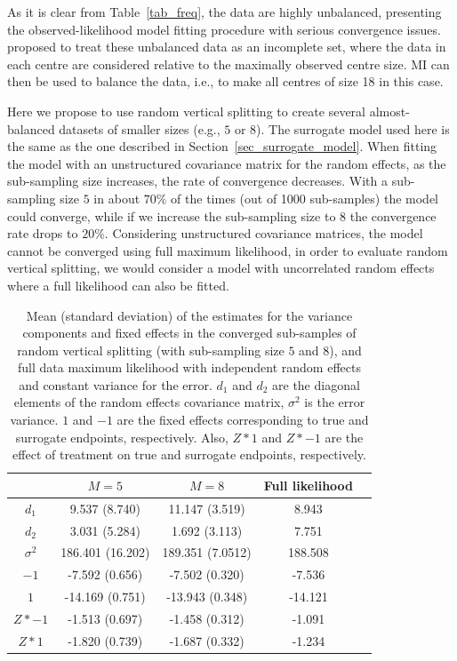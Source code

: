 \documentclass[11pt,a5paper,twoside]{book}
\begin{document}
As it is clear from Table~\ref{tab_freq}, the data are highly unbalanced, presenting the observed-likelihood model fitting procedure with serious convergence issues. \cite{wim2015} proposed to treat these unbalanced data as an incomplete set, where the data in each centre are considered relative to the maximally observed centre size. MI can then be used to balance the data, i.e., to make all centres of size 18 in this case. 

Here we propose to use random vertical splitting to create several almost- balanced datasets of smaller sizes (e.g., $5$ or $8$). The surrogate model used here is the same as the one described in Section~\ref{sec_surrogate_model}. When fitting the model with an unstructured covariance matrix for the random effects, as the sub-sampling size increases, the rate of convergence decreases. With a sub-sampling size $5$ in about $70\%$ of the times (out of 1000 sub-samples) the model could converge, while if we increase the sub-sampling size to $8$ the convergence rate drops to $20\%$. Considering unstructured covariance matrices, the model cannot be converged using full maximum likelihood, in order to evaluate random vertical splitting, we would consider a model with uncorrelated random effects where a full likelihood can also be fitted.


\begin{table}[h]
\centering
\caption[Analyzing ARMD data with random vertical splitting]{Mean (standard deviation) of the estimates for the variance components and fixed effects in the converged sub-samples of random vertical splitting (with sub-sampling size $5$ and $8$), and full data maximum likelihood with independent random effects and constant variance for the error. $d_1$ and $d_2$ are the diagonal elements of the random effects covariance matrix, $\sigma^2$ is the error variance. $1$ and $-1$ are the fixed effects corresponding to true and surrogate endpoints, respectively. Also, $Z*1$ and $Z*-1$ are the effect of treatment on true and surrogate endpoints, respectively.}
\label{summary_armd_vc}
\begin{tabular}{ccccc}
  \hline\hline
 & $M=5$ & $M=8$ & Full likelihood \\ 
  \hline
$d_1$ & 9.537 (8.740) & 11.147 (3.519) &8.943 \\ 
  $d_2$ & 3.031 (5.284) & 1.692 (3.113) & 7.751 \\ 
  $\sigma^2$ & 186.401 (16.202) & 189.351 (7.0512) 	&188.508 \\ 
  $-1$ & -7.592 (0.656) & -7.502 (0.320) 	&-7.536 \\ 
  $1$ & -14.169 (0.751) & -13.943 (0.348)  	&-14.121 \\ 
  $Z* -1$ & -1.513 (0.697) & -1.458 (0.312) 	&-1.091 \\ 
  $Z* 1$ & -1.820 (0.739) & -1.687 (0.332)	 &-1.234 \\ 
   \hline\hline
\end{tabular}
\end{table}
\end{document}
